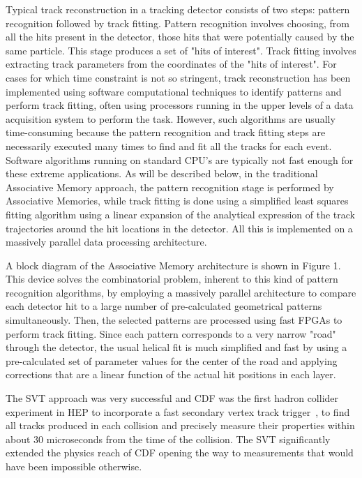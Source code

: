 \noindent Typical track reconstruction in a tracking detector consists of two steps: pattern recognition followed by track fitting. Pattern recognition involves choosing, from all the hits present in the detector, those hits that were potentially caused by the same particle. This stage produces a set of "hits of interest". Track fitting involves extracting track parameters from the coordinates of the "hits of interest". For cases for which time constraint is not so stringent, track reconstruction has been implemented using software computational techniques to identify patterns and perform track fitting, often using processors running in the upper levels of a data acquisition system to perform the task.  However, such algorithms are usually time-consuming because the pattern recognition and track fitting steps are necessarily executed many times to find and fit all the tracks for each event.  Software algorithms running on standard CPU's are typically not fast enough for these extreme applications. As will be described below, in the traditional Associative Memory approach, the pattern recognition stage is performed by Associative Memories, while track fitting is done using a simplified least squares fitting algorithm using a linear expansion of the analytical expression of the track trajectories around the hit locations in the detector. All this is implemented on a massively parallel data processing architecture.

\noindent A block diagram of the Associative Memory architecture is shown in Figure 1.  This device solves the combinatorial problem, inherent to this kind of pattern recognition algorithms, by employing a massively parallel architecture to compare each detector hit to a large number of pre-calculated geometrical patterns simultaneously. Then, the selected patterns are processed using fast FPGAs to perform track fitting. Since each pattern corresponds to a very narrow "road" through the detector, the usual helical fit is much simplified and fast by using a pre-calculated set of parameter values for the center of the road and applying corrections that are a linear function of the actual hit positions in each layer. 

\noindent The SVT approach was very successful and CDF was the first hadron collider experiment in HEP to incorporate a fast secondary vertex track trigger~\cite{bib:Ade-06}, \cite{bib:Ade-07} to find all tracks produced in each collision and precisely measure their properties within about 30 microseconds from the time of the collision. The SVT significantly extended the physics reach of CDF opening the way to measurements that would have been impossible otherwise.

